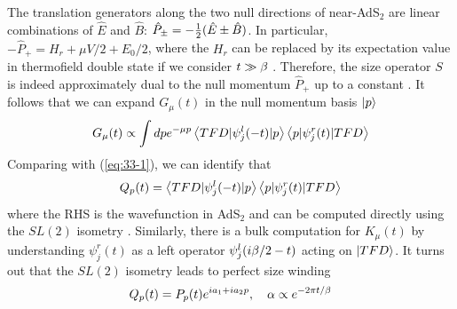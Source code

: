 \documentclass[11pt]{article}
\renewcommand{\>}{\rangle}
\newcommand{\<}{\langle}
\begin{document}
The translation generators along the two null directions of near-AdS$_{2}$
are linear combinations of $\hat{E}$ and $\hat{B}$: $\hat{P}_{\pm}=-\frac{1}{2}(\hat{E}\pm\hat{B})$.
In particular, $-\hat{P}_{+}=H_{r}+\mu V/2+E_{0}/2$, where the $H_{r}$
can be replaced by its expectation value in thermofield double state
if we consider $t\gg\beta$ \cite{Nezami:2021yaq}. Therefore, the size operator
$S$ is indeed approximately dual to the null momentum $\hat{P}_{+}$
up to a constant \cite{Maldacena:2017axo,Lin:2019qwu,Maldacena:2018lmt}. It follows that we can expand
$G_{\mu}(t)$ in the null momentum basis $\left|p\right\rangle$
\begin{equation}
G_{\mu}(t)\propto\int dpe^{-\mu p}\left\langle TFD|\psi_{j}^{l}(-t)|p\right\rangle\left\langle p|\psi_{j}^{r}(t)|TFD\right\rangle
\end{equation}
Comparing with (\ref{eq:33-1}), we can identify that 
\begin{equation}
Q_{p}(t)=\left\langle TFD|\psi_{j}^{l}(-t)|p\right\rangle\left\langle p|\psi_{j}^{r}(t)|TFD\right\rangle
\end{equation}
where the RHS is the wavefunction in AdS$_{2}$ and can be computed
directly using the $SL(2)$ isometry \cite{Maldacena:2016upp}. Similarly, there is
a bulk computation for $K_{\mu}(t)$ by understanding $\psi_{j}^{r}(t)$
as a left operator $\psi_{j}^{l}(i\beta/2-t)$ acting on $\left|TFD\right\rangle$.
It turns out that the $SL(2)$ isometry leads to perfect size winding
\cite{Maldacena:2017axo,Lin:2019qwu,Nezami:2021yaq}
\begin{equation}
Q_{p}(t)=P_{p}(t)e^{ia_{1}+ia_{2}p},\quad\alpha\propto e^{-2\pi t/\beta}
\end{equation}
\end{document}
